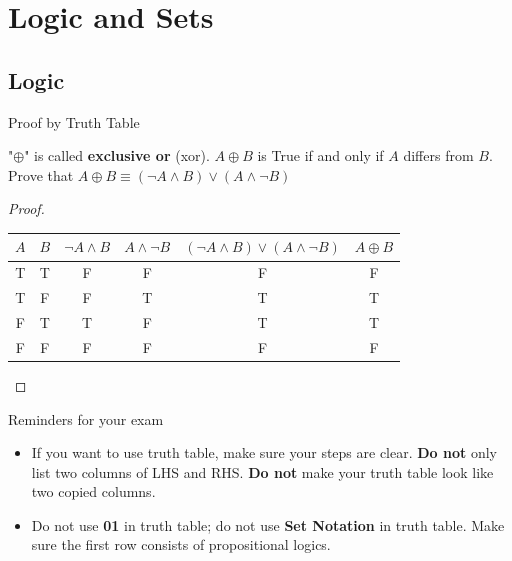 \section{Logic and Sets}
\subsection{Logic}
\outline

\begin{frame}{Proof by Truth Table}
    \begin{example}
        "$\oplus$" is called \textbf{exclusive or} (xor). $A\oplus B$ is True if and only if $A$ differs from $B$. Prove that $A\oplus B\equiv (\neg A\wedge B)\vee (A\wedge \neg B)$
    \end{example}
    \mypause
    \begin{proof}
        \begin{table}[H]
            \centering
            \begin{tabular}{|c|c|c|c|c|c|}
                $A$ & $B$ & $\neg A\wedge B$ & $A\wedge \neg B$ & $(\neg A\wedge B)\vee (A\wedge \neg B)$ & $A\oplus B$\\\hline\hline
                T & T & F & F & F & F \\
                T & F & F & T & T & T \\
                F & T & T & F & T & T \\
                F & F & F & F & F & F
            \end{tabular}
        \end{table}
    \end{proof}
\end{frame}

\begin{frame}{Reminders for your exam}
    \begin{itemize}
        \item If you want to use truth table, make sure your steps are clear. \textbf{Do not} only list two columns of LHS and RHS. \textbf{Do not} make your truth table look like two copied columns.
        \item Do not use \textbf{01} in truth table; do not use \textbf{Set Notation} in truth table. Make sure the first row consists of propositional logics.
    \end{itemize}
\end{frame}


